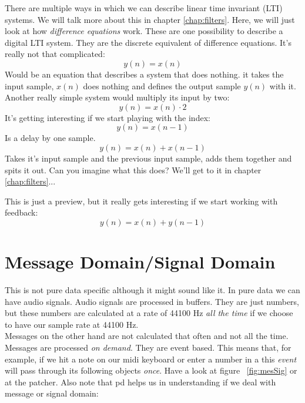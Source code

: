 There are multiple ways in which we can describe linear time invariant (LTI) systems. We will talk more about this in chapter \ref{chap:filters}. Here, we will just look at how \textit{difference equations} work. These are one possibility to describe a digital LTI system. They are the discrete equivalent of difference equations. It's really not that complicated:
\begin{equation}
	y(n) = x(n)
\end{equation}
Would be an equation that describes a system that does nothing. it takes the input sample, $x(n)$ does nothing and defines the output sample $y(n)$ with it.
Another really simple system would multiply its input by two:
\begin{equation}
	y(n) = x(n)\cdot 2
\end{equation}
It's getting interesting if we start playing with the index:
\begin{equation}
	y(n) = x(n-1)
\end{equation}
Is a delay by one sample.
\begin{equation}
	y(n) = x(n)+x(n-1)
\end{equation}
Takes it's input sample and the previous input sample, adds them together and spits it out. Can you imagine what this does? We'll get to it in chapter \ref{chap:filters}...

This is just a preview, but it really gets interesting if we start working with feedback:
\begin{equation}
 	y(n) = x(n)+y(n-1)
 \end{equation}


\section{Message Domain/Signal Domain}
This is not pure data specific although it might sound like it.
In pure data we can have audio signals. Audio signals are processed in buffers. They are just numbers, but these numbers are calculated at a rate of 44100 Hz \textit{all the time} if we choose to have our sample rate at 44100 Hz.\\
Messages on the other hand are not calculated that often and not all the time. Messages are processed \textit{on demand}. They are event based. This means that, for example, if we hit a note on our midi keyboard or enter a number in a  this \textit{event} will pass through its following objects \textit{once}. Have a look at figure ~\ref{fig:mesSig} or at the patcher. Also note that pd helps us in understanding if we deal with message or signal domain:

